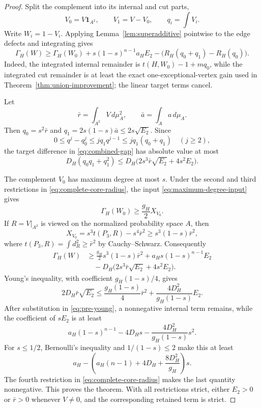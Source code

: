 \documentclass[11pt]{article}
\newcommand{\dd}{\,d}
\begin{document}
\begin{proof}
Split the complement into its internal and cut parts,
\[
 V_0=V\mathbf1_{A^2},
 \qquad V_1=V-V_0,
 \qquad q_i=\int V_i.
\]
Write $W_i=1-V_i$.  Applying Lemma~\ref{lem:superadditive} pointwise to the
edge defects and integrating gives
\begin{equation}
 \Gamma_H(W)\geq
 \Gamma_H(W_0)+s(1-s)^{n-1}a_HE_2
 -\bigl(R_H(q_0+q_1)-R_H(q_0)\bigr).
 \label{eq:combined-gap}
\end{equation}
Indeed, the integrated internal remainder is
$t(H,W_0)-1+mq_0$, while the integrated cut remainder is at least the exact
one-exceptional-vertex gain used in
Theorem~\ref{thm:union-improvement}; the linear target terms cancel.

Let
\[
 \bar r=\int_{A^2}V\dd\mu_A^2,
 \qquad \bar a=\int_Aa\dd\mu_A.
\]
Then $q_0=s^2\bar r$ and
$q_1=2s(1-s)\bar a\leq2s\sqrt{E_2}$.  Since
\[
 0\leq q^j-q_0^j\leq jq_1q^{j-1}\leq jq_1(q_0+q_1)
 \quad(j\geq2),
\]
the target difference in \eqref{eq:combined-gap} has absolute value at most
\begin{equation}
 D_H(q_0q_1+q_1^2)
 \leq D_H\bigl(2s^3\bar r\sqrt{E_2}+4s^2E_2\bigr).
 \label{eq:target-difference}
\end{equation}

The complement $V_0$ has maximum degree at most $s$.  Under the second and
third restrictions in \eqref{eq:complete-core-radius}, the input
\eqref{eq:maximum-degree-input} gives
\[
 \Gamma_H(W_0)\geq\frac{g_H}{2}X_{V_0}.
\]
If $R=V|_{A^2}$ is viewed on the normalized probability space $A$, then
\[
 X_{V_0}=s^3t(P_3,R)-s^4\bar r^2
 \geq s^3(1-s)\bar r^2,
\]
where $t(P_3,R)=\int d_R^2\geq\bar r^2$ by Cauchy--Schwarz.  Consequently
\begin{align}
 \Gamma_H(W)
 &\geq \frac{g_H}{2}s^3(1-s)\bar r^2
 +a_Hs(1-s)^{n-1}E_2 \\
 &\quad-D_H\bigl(2s^3\bar r\sqrt{E_2}+4s^2E_2\bigr).
 \label{eq:pre-young}
\end{align}
Young's inequality, with coefficient $g_H(1-s)/4$, gives
\[
 2D_H\bar r\sqrt{E_2}
 \leq\frac{g_H(1-s)}4\bar r^2
 +\frac{4D_H^2}{g_H(1-s)}E_2.
\]
After substitution in \eqref{eq:pre-young}, a nonnegative internal term
remains, while the coefficient of $sE_2$ is at least
\[
 a_H(1-s)^{n-1}-4D_Hs
 -\frac{4D_H^2}{g_H(1-s)}s^2.
\]
For $s\leq1/2$, Bernoulli's inequality and
$1/(1-s)\leq2$ make this at least
\[
 a_H-\left(a_H(n-1)+4D_H+\frac{8D_H^2}{g_H}\right)s.
\]
The fourth restriction in \eqref{eq:complete-core-radius} makes the last
quantity nonnegative.  This proves the theorem.  With all restrictions
strict, either $E_2>0$ or $\bar r>0$ whenever $V\ne0$, and the corresponding
retained term is strict.
\end{proof}
\end{document}
